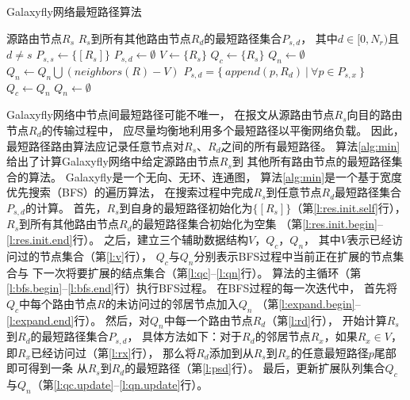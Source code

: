 \begin{algorithm}[t]
  \caption{Galaxyfly网络最短路径算法}
  \label{alg:min}
  \begin{algorithmic}[1]
    \REQUIRE 源路由节点$R_s$
    \ENSURE $R_s$到所有其他路由节点$R_d$的最短路径集合$P_{s,d}$，
    其中$d \in [0, N_r)$且$d \neq s$
    \STATE $P_{s,s} \gets \lbrace [R_s] \rbrace$ \label{l:res.init.self}
    \FOR {$d \in [0, N_r) \land d \neq s$} \label{l:res.init.begin}
    \STATE $P_{s,d} \gets \emptyset$
    \ENDFOR \label{l:res.init.end}
    \STATE $V \gets \lbrace R_s \rbrace$ \label{l:v}
    \STATE $Q_c \gets \lbrace R_s \rbrace$ \label{l:qc}
    \STATE $Q_n \gets \emptyset$ \label{l:qn}
     \label{l:bfs.begin}
     \label{l:expand.begin}
    \STATE $Q_n \gets Q_n \bigcup (neighbors(R) - V)$
    \ENDFOR \label{l:expand.end}
     \label{l:rd}
     \label{l:rx}
    \STATE $P_{s,d} = \lbrace\ append(p, R_d)\ |\ \forall p \in P_{s,x}\ \rbrace$ \label{l:psd}
    \ENDFOR
    \ENDFOR
    \STATE $Q_c \gets Q_n$ \label{l:qc.update}
    \STATE $Q_n \gets \emptyset$ \label{l:qn.update}
    \ENDWHILE \label{l:bfs.end}
  \end{algorithmic}
\end{algorithm}

Galaxyfly网络中节点间最短路径可能不唯一，
在报文从源路由节点$R_s$向目的路由节点$R_d$的传输过程中，
应尽量均衡地利用多个最短路径以平衡网络负载。
因此，最短路径路由算法应记录任意节点对$R_s$、$R_d$之间的所有最短路径。
算法\ref{alg:min}给出了计算Galaxyfly网络中给定源路由节点$R_s$到
其他所有路由节点的最短路径集合的算法。
Galaxyfly是一个无向、无环、连通图，
算法\ref{alg:min}是一个基于宽度优先搜索（BFS）的遍历算法，
在搜索过程中完成$R_s$到任意节点$R_d$最短路径集合$P_{s,d}$的计算。
首先，$R_s$到自身的最短路径初始化为$\{[R_s]\}$（第\ref{l:res.init.self}行），
$R_s$到所有其他路由节点$R_d$的最短路径集合初始化为空集
（第\ref{l:res.init.begin}--\ref{l:res.init.end}行）。
之后，建立三个辅助数据结构$V$，$Q_c$，$Q_n$，
其中$V$表示已经访问过的节点集合（第\ref{l:v}行），
$Q_c$与$Q_n$分别表示BFS过程中当前正在扩展的节点集合与
下一次将要扩展的结点集合（第\ref{l:qc}--\ref{l:qn}行）。
算法的主循环（第\ref{l:bfs.begin}--\ref{l:bfs.end}行）执行BFS过程。
在BFS过程的每一次迭代中，
首先将$Q_c$中每个路由节点$R$的未访问过的邻居节点加入$Q_n$
（第\ref{l:expand.begin}--\ref{l:expand.end}行）。
然后，对$Q_n$中每一个路由节点$R_d$（第\ref{l:rd}行），
开始计算$R_s$到$R_d$的最短路径集合$P_{s,d}$，
具体方法如下：对于$R_d$的邻居节点$R_x$，如果$R_x \in V$，即$R_x$已经访问过（第\ref{l:rx}行），
那么将$R_d$添加到从$R_s$到$R_x$的任意最短路径$p$尾部即可得到一条
从$R_s$到$R_d$的最短路径（第\ref{l:psd}行）。
最后，更新扩展队列集合$Q_c$与$Q_n$（第\ref{l:qc.update}--\ref{l:qn.update}行）。

